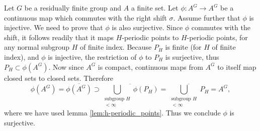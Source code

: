 Let $G$ be a residually finite group and $A$ a finite set. Let $\phi: A^G \to A^G$ be a continuous map which commutes with the right shift $\sigma$. Assume further that $\phi$ is injective. We need to prove that $\phi$ is also surjective. Since $\phi$ commutes with the shift, it follows readily that it maps $H$-periodic points to $H$-periodic points, for any normal subgroup $H$ of finite index.
Because $P_H$ is finite (for $H$ of finite index), and $\phi$ is injective, the restriction of $\phi$ to $P_H$ is surjective, thus $P_H \subset \phi(A^G)$. Now since $A^G$ is compact, continuous maps from $A^G$ to itself map closed sets to closed sets. Therefore
\[
\phi(A^G) = \overline{\phi(A^G)} \supset
\overline{\bigcup_{\substack{\text{subgroup } H \\ [G : H] < \infty}}\phi( P_H)}
= \overline{\bigcup_{\substack{\text{subgroup } H \\ [G : H] < \infty}} P_H} = A^G,
\]
where we have used lemma \ref{lem:h-periodic_points}. Thus we conclude $\phi$ is surjective.
